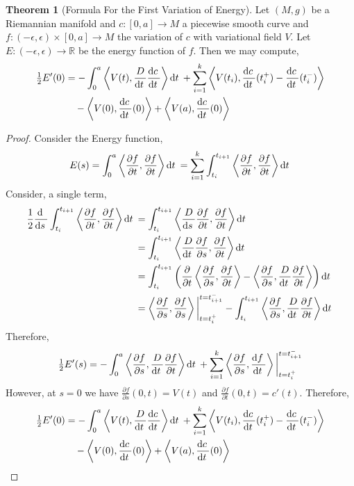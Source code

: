 \documentclass[12pt]{extarticle}
\newcommand{\R}{\mathbb{R}}
\renewcommand{\d}[1]{ \mathrm{d}#1 \:}
\newcommand{\deriv}[2]{\frac{\d{#1}}{\d{#2}}}
\newcommand{\pderiv}[2]{\frac{\partial{#1}}{\partial{#2}}}
\theoremstyle{definition}
\newtheorem{theorem}{Theorem}[section]
\begin{document}
\begin{theorem}[Formula For the First Variation of Energy]
Let $(M, g)$ be a Riemannian manifold and $c : [0, a] \to M$ a piecewise smooth curve and $f : (-\epsilon, \epsilon) \times [0, a] \to M$ the variation of $c$ with variational field $V$. Let $E : (-\epsilon, \epsilon) \to \R$ be the energy function of $f$. Then we may compute,
\begin{align*}
\tfrac{1}{2} E'(0) & = - \int_0^a \inner{V(t)}{\frac{D}{\d{t}} \deriv{c}{t}}\d{t} + \sum_{i = 1}^k \inner{V(t_i)}{\deriv{c}{t}(t_i^+) - \deriv{c}{t}(t_i^{-})} 
\\
& \quad - \inner{V(0)}{\deriv{c}{t}(0)} + \inner{V(a)}{\deriv{c}{t}(0)} 
\end{align*} 
\end{theorem}

\begin{proof}
Consider the Energy function,
\[ E(s) = \int_0^a \inner{\pderiv{f}{t}}{\pderiv{f}{t}} \d{t} = \sum_{i = 1}^k \int_{t_i}^{t_{i+1}} \inner{\pderiv{f}{t}}{\pderiv{f}{t}} \d{t} \]
Consider, a single term,
\begin{align*}
\frac{1}{2} \deriv{}{s} \int_{t_i}^{t_{i+1}} \inner{\pderiv{f}{t}}{\pderiv{f}{t}} \d{t} & = \int_{t_i}^{t_{i+1}} \inner{\frac{D}{\d{s}} \pderiv{f}{t}}{\pderiv{f}{t}} \d{t} 
\\
& = \int_{t_i}^{t_{i+1}} \inner{\frac{D}{\d{t}} \pderiv{f}{s}}{\pderiv{f}{t}} \d{t} 
\\
& = \int_{t_i}^{t_{i+1}} \left( \pderiv{}{t} \inner{\pderiv{f}{s}}{\pderiv{f}{t}} - \inner{\pderiv{f}{s}}{\frac{D}{\d{t}} \pderiv{f}{t}} \right) \d{t}
\\
& = \inner{\pderiv{f}{s}}{\pderiv{f}{s}} \bigg|_{t = t_i^+}^{t = t_{i+1}^{-}} - \int_{t_i}^{t_{i+1}} \inner{\pderiv{f}{s}}{\frac{D}{\d{t}} \pderiv{f}{t}} \d{t}
\end{align*}
Therefore,
\begin{align*}
\tfrac{1}{2} E'(s) = - \int_0^a \inner{\pderiv{f}{s}}{\frac{D}{\d{t}} \pderiv{f}{t}} \d{t}  + \sum_{i = 1}^k \inner{\pderiv{f}{s}}{\deriv{f}{t}} \bigg|_{t = t_i^+}^{t = t_{i+1}^-}
\end{align*}
However, at $s = 0$ we have $\pderiv{f}{s}(0, t) = V(t)$ and $\pderiv{f}{t}(0, t) = c'(t)$. Therefore,
\begin{align*}
\tfrac{1}{2} E'(0) & = - \int_0^a \inner{V(t)}{\frac{D}{\d{t}} \deriv{c}{t}}\d{t} + \sum_{i = 1}^k \inner{V(t_i)}{\deriv{c}{t}(t_i^+) - \deriv{c}{t}(t_i^{-})} 
\\
& \quad - \inner{V(0)}{\deriv{c}{t}(0)} + \inner{V(a)}{\deriv{c}{t}(0)} 
\end{align*} 
\end{proof}
\end{document}
